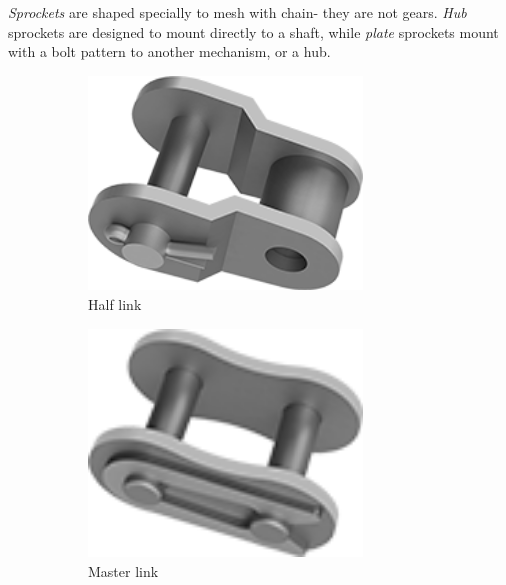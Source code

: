 \textit{Sprockets} are shaped specially to mesh with chain- they are not gears. \textit{Hub} sprockets are designed to mount directly to a shaft, while \textit{plate} sprockets mount with a bolt pattern to another mechanism, or a hub.

\begin{figure}[H]
	\begin{subfigure}[b]{.32\linewidth}
		\includegraphics[width=0.8\textwidth]{imgs/chain_halflink.png}
		\caption{Half link}
	\end{subfigure}\begin{subfigure}[b]{.32\linewidth}
		\includegraphics[width=0.8\textwidth]{imgs/chain_masterlink.png}
		\caption{Master link}
	\end{subfigure}\begin{subfigure}[b]{.32\linewidth}

\end{subfigure}
\end{figure}
